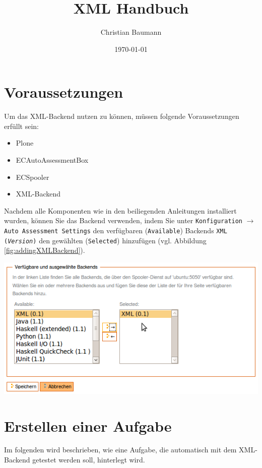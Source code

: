 \documentclass[a4paper]{scrartcl}
\title{XML Handbuch}
\author{Christian Baumann}
\date{\today}
\newcommand{\anf}[1]{\glqq{}#1\grqq{}}
\begin{document}
  \tableofcontents
  
  \newpage
  
	\section{Voraussetzungen}
	Um das XML-Backend nutzen zu können, müssen folgende Voraussetzungen erfüllt sein:
	\begin{itemize}
	  \item Plone
	  \item ECAutoAssessmentBox
	  \item ECSpooler
	  \item XML-Backend
	\end{itemize}
	Nachdem alle Komponenten wie in den beiliegenden Anleitungen installiert wurden, können Sie das Backend verwenden, indem Sie unter \texttt{Konfiguration} $\rightarrow$ \texttt{Auto Assessment Settings} den verfügbaren (\texttt{Available}) Backends \anf{\texttt{XML (\textit{Version})}} den gewählten (\texttt{Selected}) hinzufügen (vgl. Abbildung \ref{fig:addingXMLBackend}).
	
  \begin{center}
	  \includegraphics[width=1\textwidth]{images/AddingXMLBackend.png}
	  \label{fig:addingXMLBackend}
  \end{center}
	
	\section{Erstellen einer Aufgabe}
	  Im folgenden wird beschrieben, wie eine Aufgabe, die automatisch mit dem XML-Backend getestet werden soll, hinterlegt wird.
	  
\end{document}
